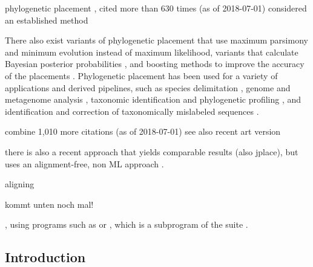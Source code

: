 phylogenetic placement \cite{Matsen2010,Berger2011,Barbera2018}, cited more than 630 times (as of 2018-07-01)
considered an established method

There also exist variants of phylogenetic placement that use maximum parsimony \cite{Berger2011}
and minimum evolution \cite{Filipski2015} instead of maximum likelihood,
variants that calculate Bayesian posterior probabilities \cite{Matsen2010},
and boosting methods to improve the accuracy of the placements \cite{Mirarab2012}.
Phylogenetic placement has been used for a variety of applications and derived pipelines, such as
species delimitation \cite{Zhang2013,Kapli2017},
genome and metagenome analysis \cite{Darling2014},
taxonomic identification and phylogenetic profiling \cite{Nguyen2014}, and
identification and correction of taxonomically mislabeled sequences \cite{Kozlov2016}.

combine 1,010 more citations (as of 2018-07-01)
see also recent art version

there is also a recent approach that yields comparable results (also jplace), but uses an alignment-free, non ML approach \cite{Linard2018}.


aligning

kommt unten noch mal!

, using programs such as  \citep{Berger2011a,Berger2012} or
, which is a subprogram of the  suite \citep{Eddy1998,Eddy2009}.


\subsection{Introduction}
\label{ch:Foundations:sec:PhylogeneticPlacement:sub:Introduction}


